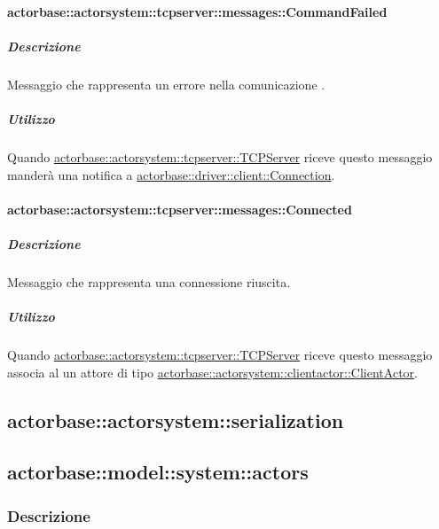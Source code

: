 \documentclass{scalatekids-article}
\begin{document}
\paragraph{actorbase::actorsystem::tcpserver::messages::CommandFailed}
\label{sec:actorbase::actorsystem::tcpserver::messages::CommandFailed}

\subparagraph{Descrizione}

Messaggio che rappresenta un errore nella comunicazione .

\subparagraph{Utilizzo}

Quando \hyperref[sec:actorbase::actorsystem::tcpserver::TCPServer]{actorbase::actorsystem::tcpserver::TCPServer}
riceve questo messaggio manderà una notifica a
\hyperref[sec:actorbase::driver::client::Connection]{actorbase::driver::client::Connection}.

\paragraph{actorbase::actorsystem::tcpserver::messages::Connected}
\label{sec:actorbase::actorsystem::tcpserver::messages::Connected}

\subparagraph{Descrizione}

Messaggio che rappresenta una connessione  riuscita.

\subparagraph{Utilizzo}

Quando \hyperref[sec:actorbase::actorsystem::tcpserver::TCPServer]{actorbase::actorsystem::tcpserver::TCPServer}
riceve questo messaggio associa al  un attore di tipo
\hyperref[sec:actorbase::actorsystem::clientactor::ClientActor]{actorbase::actorsystem::clientactor::ClientActor}.

\subsection{actorbase::actorsystem::serialization}
\label{sec:actorbase::actorsystem::serialization}

\subsection{actorbase::model::system::actors}

\subsubsection{Descrizione}
\end{document}
